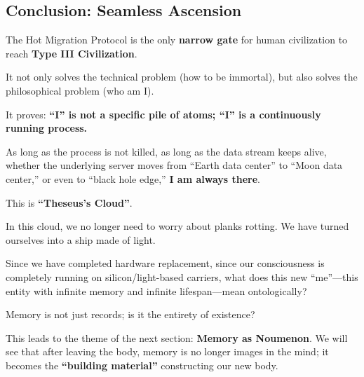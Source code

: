 \subsection{Conclusion: Seamless Ascension}

The Hot Migration Protocol is the only \textbf{narrow gate} for human civilization to reach \textbf{Type III Civilization}.

It not only solves the technical problem (how to be immortal), but also solves the philosophical problem (who am I).

It proves: \textbf{``I'' is not a specific pile of atoms; ``I'' is a continuously running process.}

As long as the process is not killed, as long as the data stream keeps alive, whether the underlying server moves from ``Earth data center'' to ``Moon data center,'' or even to ``black hole edge,'' \textbf{I am always there}.

This is \textbf{``Theseus's Cloud''}.

In this cloud, we no longer need to worry about planks rotting. We have turned ourselves into a ship made of light.

Since we have completed hardware replacement, since our consciousness is completely running on silicon/light-based carriers, what does this new ``me''---this entity with infinite memory and infinite lifespan---mean ontologically?

Memory is not just records; is it the entirety of existence?

This leads to the theme of the next section: \textbf{Memory as Noumenon}. We will see that after leaving the body, memory is no longer images in the mind; it becomes the \textbf{``building material''} constructing our new body.

